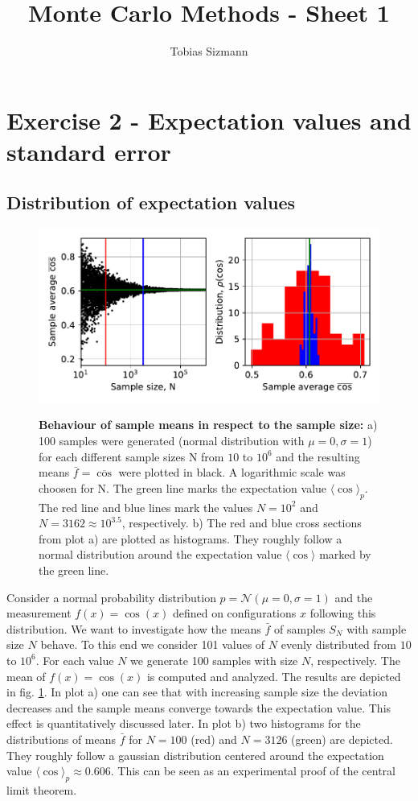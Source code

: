 \documentclass[11pt, a4paper]{article}
\title{Monte Carlo Methods - Sheet 1}
\author{Tobias Sizmann}
\begin{document}
\maketitle
\section{Exercise 2 - Expectation values and standard error}
    \subsection{Distribution of expectation values}
        \begin{figure}
            \includegraphics{fig1.pdf}
            \label{fig1}
            \caption{\textbf{Behaviour of sample means in respect to the sample size:} a) 100 samples were generated (normal distribution with $\mu = 0, \sigma = 1$) for each different sample sizes N from $10$ to $10^6$ and the resulting means $\bar{f} = \overline{\cos}$ were plotted in black. A logarithmic scale was choosen for N. The green line marks the expectation value $\langle \cos \rangle_p$. The red line and blue lines mark the values $N = 10^2$ and $N = 3162 \approx 10^{3.5}$, respectively. b) The red and blue cross sections from plot a) are plotted as histograms. They roughly follow a normal distribution around the expectation value $\langle \cos \rangle$ marked by the green line.}
        \end{figure}

        Consider a normal probability distribution $p = \mathcal{N}(\mu = 0, \sigma = 1)$ and the measurement $f(x) = \cos(x)$ defined on configurations $x$ following this distribution. We want to investigate how the means $\bar{f}$ of samples $S_N$ with sample size $N$ behave. To this end we consider 101 values of $N$ evenly distributed from $10$ to $10^6$. For each value $N$ we generate 100 samples with size $N$, respectively. The mean of $f(x) = \cos(x)$ is computed and analyzed. The results are depicted in fig. \ref{fig1}. In plot a) one can see that with increasing sample size the deviation decreases and the sample means converge towards the expectation value. This effect is quantitatively discussed later. In plot b) two histograms for the distributions of means $\bar{f}$ for $N = 100$ (red) and $N = 3126$ (green) are depicted. They roughly follow a gaussian distribution centered around the expectation value $\langle \cos \rangle_p \approx 0.606$. This can be seen as an experimental proof of the central limit theorem.
\end{document}
